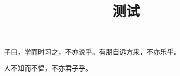 \documentclass[四库全书彩色]{ltc-guji}
\title{测试}
\begin{document}
\begin{正文}
子曰，学而时习之，不亦说乎。有朋自远方来，不亦乐乎。

人不知而不愠，不亦君子乎。
\end{正文}
\end{document}
